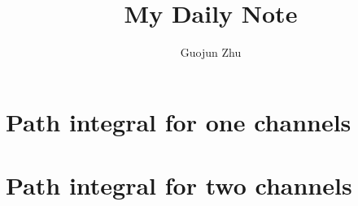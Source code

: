 \documentclass{article}
\author{Guojun Zhu}
\title{My Daily Note}
\begin{document}

{}


%
%
%
%
%
%
\section{Path integral for one channels}

\section{Path integral for two channels}



\end{document}
